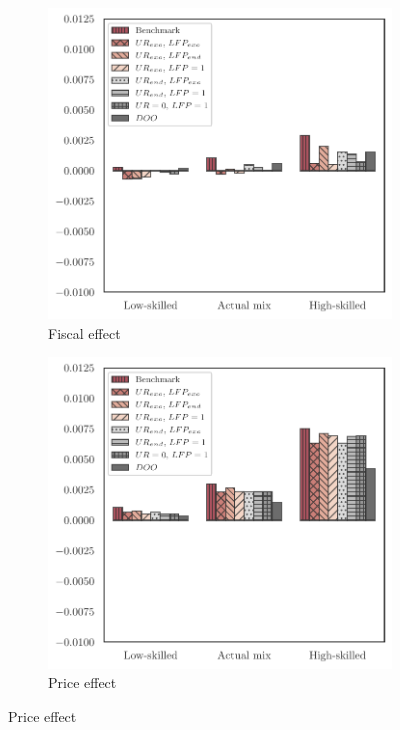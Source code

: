 \documentclass[a4paper,12pt]{article}
\begin{document}
\begin{landscape}
\begin{center}
\begin{figure}[htb!]
\begin{subfigure}{.3\linewidth}
  \centering
\caption{Fiscal effect} \label{fig:decomp_mean_tau}
  \includegraphics[width=\linewidth]{graphs/qTau.pdf}
\end{subfigure}%
\hfill
\begin{subfigure}{.3\linewidth}
  \centering
\caption{Price effect} \label{fig:decomp_mean_P}
  \includegraphics[width=\linewidth]{graphs/qP.pdf}

\end{subfigure}
\end{figure}
\end{center}
\end{landscape}
\end{document}
